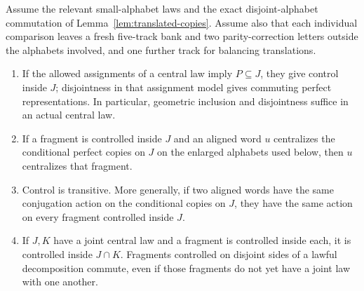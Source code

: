 \begin{lemma}\label{lem:control}
Assume the relevant small-alphabet laws and the exact
disjoint-alphabet commutation of
Lemma~\ref{lem:translated-copies}.  Assume also that each
individual comparison leaves a fresh five-track bank and two
parity-correction letters outside the alphabets involved,
and one further track for balancing translations.
\begin{enumerate}[label=(\alph*)]
\item If the allowed assignments of a central law imply
      $P\subseteq J$, they give control inside $J$; disjointness
      in that assignment model gives commuting perfect
      representations.  In particular, geometric inclusion
      and disjointness suffice in an actual central law.
\item If a fragment is controlled inside $J$ and an aligned
      word $u$ centralizes the conditional perfect copies on
      $J$ on the enlarged alphabets used below, then $u$
      centralizes that fragment.
\item Control is transitive.  More generally, if two aligned
      words have the same conjugation action on the conditional
      copies on $J$, they have the same action on every
      fragment controlled inside $J$.
\item If $J,K$ have a joint central law and a fragment is
      controlled inside each, it is controlled inside
      $J\cap K$.  Fragments controlled on disjoint sides of
      a lawful decomposition commute, even if those fragments
      do not yet have a joint law with one another.
\end{enumerate}
\end{lemma}

